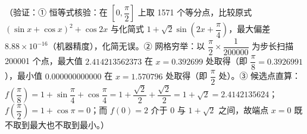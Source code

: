 \begin{answer}
（验证：① 恒等式核验：在 \(\left[0,\dfrac{\pi}{2}\right]\) 上取 1571 个等分点，比较原式 \((\sin x+\cos x)^2+\cos 2x\) 与化简式 \(1+\sqrt{2}\sin\left(2x+\dfrac{\pi}{4}\right)\)，最大偏差 \(8.88\times10^{-16}\)（机器精度），化简无误。② 网格穷举：以 \(\dfrac{\pi}{2}\times\dfrac{1}{200000}\) 为步长扫描 200001 个点，最大值 \(2.414213562373\) 在 \(x=0.392699\) 处取得（即 \(\dfrac{\pi}{8}=0.3926991\)），最小值 \(0.000000000000\) 在 \(x=1.570796\) 处取得（即 \(\dfrac{\pi}{2}\) 处）。③ 候选点直算：\(f\left(\dfrac{\pi}{8}\right)=1+\sin\dfrac{\pi}{4}+\cos\dfrac{\pi}{4}=1+\dfrac{\sqrt{2}}{2}+\dfrac{\sqrt{2}}{2}=1+\sqrt{2}=2.4142135624\)；\(f\left(\dfrac{\pi}{2}\right)=1+\cos\pi=0\)；而 \(f(0)=2\) 介于 \(0\) 与 \(1+\sqrt{2}\) 之间，故端点 \(x=0\) 既不取到最大也不取到最小。）



\end{answer}
